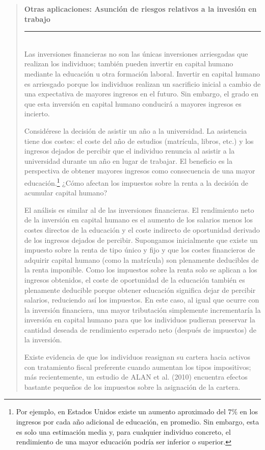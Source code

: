 \documentclass[10pt,a4paper]{article}
\newenvironment{specialblock}[1]{%
      \begin{quote} %
      \small %
      \noindent\textbf{#1}\\[-0.3em] %
      \rule{\linewidth}{0.4pt}\\[0.6em]}{
      \end{quote}}
\begin{document}
\begin{specialblock}{\textbf{Otras aplicaciones}: Asunción de riesgos relativos a la invesión en trabajo}
    Las inversiones financieras no son las únicas inversiones arriesgadas que realizan los individuos; también pueden invertir en capital humano mediante la educación u otra formación laboral. Invertir en capital humano es arriesgado porque los individuos realizan un sacrificio inicial a cambio de una expectativa de mayores ingresos en el futuro. Sin embargo, el grado en que esta inversión en capital humano conducirá a mayores ingresos es incierto.

    Considérese la decisión de asistir un año a la universidad. La asistencia tiene dos costes: el coste del año de estudios (matrícula, libros, etc.) y los ingresos dejados de percibir que el individuo renuncia al asistir a la universidad durante un año en lugar de trabajar. El beneficio es la perspectiva de obtener mayores ingresos como consecuencia de una mayor educación.\footnote{%
        Por ejemplo, en Estados Unidos existe un aumento aproximado del $7\%$ en los ingresos por cada año adicional de educación, en promedio. Sin embargo, esta es solo una estimación media y, para cualquier individuo concreto, el rendimiento de una mayor educación podría ser inferior o superior.
    } ¿Cómo afectan los impuestos sobre la renta a la decisión de acumular capital humano? 
    
    El análisis es similar al de las inversiones financieras. El rendimiento neto de la inversión en capital humano es el aumento de los salarios menos los costes directos de la educación y el coste indirecto de oportunidad derivado de los ingresos dejados de percibir. Supongamos inicialmente que existe un impuesto sobre la renta de tipo único y fijo y que los costes financieros de adquirir capital humano (como la matrícula) son plenamente deducibles de la renta imponible. Como los impuestos sobre la renta solo se aplican a los ingresos obtenidos, el coste de oportunidad de la educación también es plenamente deducible porque obtener educación significa dejar de percibir salarios, reduciendo así los impuestos. En este caso, al igual que ocurre con la inversión financiera, una mayor tributación simplemente incrementaría la inversión en capital humano para que los individuos pudieran preservar la cantidad deseada de rendimiento esperado neto (después de impuestos) de la inversión.
    
    Existe evidencia de que los individuos reasignan su cartera hacia activos con tratamiento fiscal preferente cuando aumentan los tipos impositivos; más recientemente, un estudio de ALAN et al. (2010) encuentra efectos bastante pequeños de los impuestos sobre la asignación de la cartera.
    

\end{specialblock}
\end{document}
